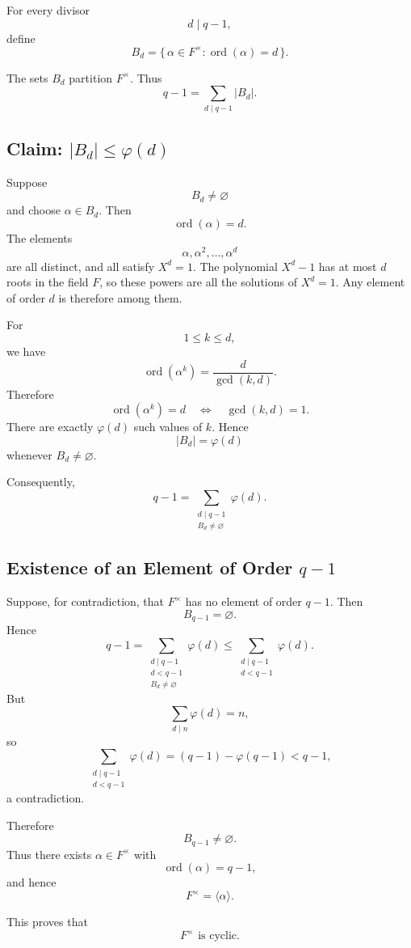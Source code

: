 \documentclass[11pt]{article}
\theoremstyle{remark}
\DeclareMathOperator{\gcdop}{gcd}
\DeclareMathOperator{\ord}{ord}
\newcommand{\phiE}{\varphi}
\begin{document}
For every divisor
\[
    d\mid q-1,
\]
define
\[
    B_d
    =
    \{\,\alpha\in F^\times:\ord(\alpha)=d\,\}.
\]

The sets $B_d$ partition $F^\times$. Thus
\[
    q-1
    =
    \sum_{d\mid q-1}|B_d|.
\]

\subsection{Claim: $|B_d|\le\phiE(d)$}

Suppose
\[
    B_d\neq\varnothing
\]
and choose $\alpha\in B_d$. Then
\[
    \ord(\alpha)=d.
\]
The elements
\[
    \alpha,\alpha^2,\ldots,\alpha^d
\]
are all distinct, and all satisfy $X^d=1$. The polynomial $X^d-1$ has at
most $d$ roots in the field $F$, so these powers are all the solutions of
$X^d=1$. Any element of order $d$ is therefore among them.

For
\[
    1\le k\le d,
\]
we have
\[
    \ord(\alpha^k)
    =
    \frac{d}{\gcdop(k,d)}.
\]
Therefore
\[
    \ord(\alpha^k)=d
    \quad\Longleftrightarrow\quad
    \gcdop(k,d)=1.
\]
There are exactly $\phiE(d)$ such values of $k$. Hence
\[
    |B_d|=\phiE(d)
\]
whenever $B_d\neq\varnothing$.

Consequently,
\[
    q-1
    =
    \sum_{\substack{d\mid q-1\\B_d\neq\varnothing}}
    \phiE(d).
\]

\subsection{Existence of an Element of Order $q-1$}

Suppose, for contradiction, that $F^\times$ has no element of order
$q-1$. Then
\[
    B_{q-1}=\varnothing.
\]
Hence
\[
    q-1
    =
    \sum_{\substack{d\mid q-1\\d<q-1\\B_d\neq\varnothing}}
    \phiE(d)
    \le
    \sum_{\substack{d\mid q-1\\d<q-1}}\phiE(d).
\]
But
\[
    \sum_{d\mid n}\phiE(d)=n,
\]
so
\[
    \sum_{\substack{d\mid q-1\\d<q-1}}\phiE(d)
    =
    (q-1)-\phiE(q-1)
    <q-1,
\]
a contradiction.

Therefore
\[
    B_{q-1}\neq\varnothing.
\]
Thus there exists $\alpha\in F^\times$ with
\[
    \ord(\alpha)=q-1,
\]
and hence
\[
    F^\times=\langle\alpha\rangle.
\]

This proves that
\[
    \boxed{F^\times\text{ is cyclic}.}
\]
\end{document}
